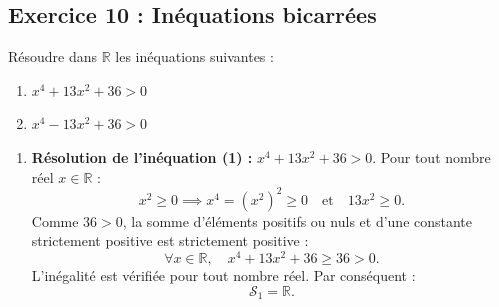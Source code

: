 \documentclass[11pt,a4paper]{article}
\newcommand{\R}{\mathbb{R}}
\begin{document}
\subsection*{Exercice 10 : Inéquations bicarrées}
Résoudre dans $\R$ les inéquations suivantes :
\begin{enumerate}
    \item $x^4 + 13x^2 + 36 > 0$
    \item $x^4 - 13x^2 + 36 > 0$
\end{enumerate}

\begin{correctionbox}
\begin{enumerate}
    \item \textbf{Résolution de l'inéquation (1) :} $x^4 + 13x^2 + 36 > 0$.
    Pour tout nombre réel $x \in \R$ :
    \[
    x^2 \ge 0 \implies x^4 = (x^2)^2 \ge 0 \quad \text{et} \quad 13x^2 \ge 0.
    \]
    Comme $36 > 0$, la somme d'éléments positifs ou nuls et d'une constante strictement positive est strictement positive :
    \[
    \forall x \in \R, \quad x^4 + 13x^2 + 36 \ge 36 > 0.
    \]
    L'inégalité est vérifiée pour tout nombre réel. Par conséquent :
    \[
    \mathcal{S}_1 = \R.
    \]


\end{enumerate}
\end{correctionbox}
\end{document}
